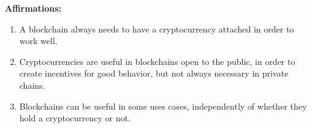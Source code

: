 \textbf{Affirmations: }
\begin{enumerate}
\item A blockchain always needs to have a cryptocurrency attached in order to work well.
\item Cryptocurrencies are useful in blockchains open to the public, in order to create incentives for good behavior, but not always necessary in private chains.
\item Blockchains can be useful in some uses cases, independently of whether they hold a cryptocurrency or not.
\end{enumerate}


